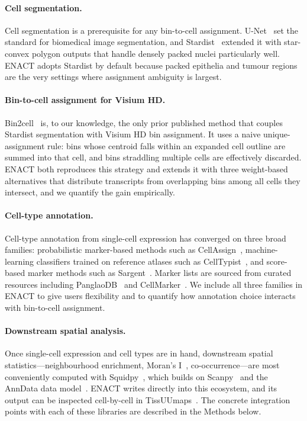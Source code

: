 \documentclass[11pt]{article}
\begin{document}
\paragraph{Cell segmentation.}
Cell segmentation is a prerequisite for any bin-to-cell assignment. U-Net~\cite{ronneberger2015unet} set the standard for biomedical image segmentation, and Stardist~\cite{schmidt2018stardist} extended it with star-convex polygon outputs that handle densely packed nuclei particularly well. ENACT adopts Stardist by default because packed epithelia and tumour regions are the very settings where assignment ambiguity is largest.

\paragraph{Bin-to-cell assignment for Visium HD.}
Bin2cell~\cite{polacco2024bin2cell} is, to our knowledge, the only prior published method that couples Stardist segmentation with Visium HD bin assignment. It uses a naive unique-assignment rule: bins whose centroid falls within an expanded cell outline are summed into that cell, and bins straddling multiple cells are effectively discarded. ENACT both reproduces this strategy and extends it with three weight-based alternatives that distribute transcripts from overlapping bins among all cells they intersect, and we quantify the gain empirically.

\paragraph{Cell-type annotation.}
Cell-type annotation from single-cell expression has converged on three broad families: probabilistic marker-based methods such as CellAssign~\cite{zhang2019probabilistic}, machine-learning classifiers trained on reference atlases such as CellTypist~\cite{conde2022celltypist}, and score-based marker methods such as Sargent~\cite{nouri2024sargent}. Marker lists are sourced from curated resources including PanglaoDB~\cite{franzen2019panglaodb} and CellMarker~\cite{zhang2019cellmarker}. We include all three families in ENACT to give users flexibility and to quantify how annotation choice interacts with bin-to-cell assignment.

\paragraph{Downstream spatial analysis.}
Once single-cell expression and cell types are in hand, downstream spatial statistics---neighbourhood enrichment, Moran's I~\cite{moran1950notes}, co-occurrence---are most conveniently computed with Squidpy~\cite{palla2022squidpy}, which builds on Scanpy~\cite{wolf2018scanpy} and the AnnData data model~\cite{virshup2024anndata}. ENACT writes directly into this ecosystem, and its output can be inspected cell-by-cell in TissUUmaps~\cite{pielawski2023tissuumaps}. The concrete integration points with each of these libraries are described in the Methods below.
\end{document}
